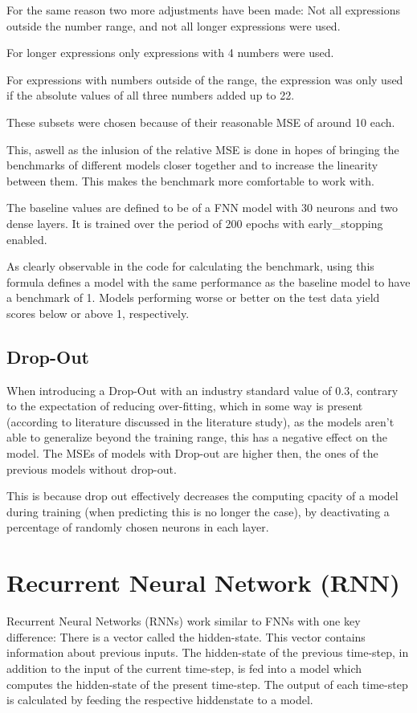 \documentclass{article}
\begin{document}
For the same reason two more adjustments have been made:
Not all expressions outside the number range, and not all longer expressions 
were used. 

For longer expressions only expressions with 4 numbers were used.

For expressions with numbers outside of the range, the expression was only 
used if the absolute values of all three numbers added up to 22.

These subsets were chosen because of their reasonable MSE of around 10 each.

This, aswell as the inlusion of the relative MSE is done in hopes of 
bringing the benchmarks of different models closer together and to increase 
the linearity between them. This makes the benchmark more comfortable to 
work with.

The baseline values are defined to be of a FNN model with 30 neurons and two 
dense layers. It is trained over the period of 200 epochs with 
early\_stopping enabled.

As clearly observable in the code for calculating the benchmark, using this 
formula defines a model with the same performance as the baseline model to 
have a benchmark of 1. Models performing worse or better on the test data 
yield scores below or above 1, respectively.


\subsection{Drop-Out}
When introducing a Drop-Out with an industry standard value of 0.3, contrary 
to the expectation of reducing over-fitting, which in some way is present 
(according to literature discussed in the literature study), as the models 
aren't able to generalize beyond the training range, this has a negative 
effect on the model. The MSEs of models with Drop-out are higher then, the 
ones of the previous models without drop-out. 

This is because drop out effectively decreases the computing cpacity of a 
model during training (when predicting this is no longer the case), by 
deactivating a percentage of randomly chosen neurons in each layer.

\section{Recurrent Neural Network (RNN)}
Recurrent Neural Networks (RNNs) work similar to FNNs with one key 
difference: There is a vector called the hidden-state. This vector contains 
information about previous inputs. The hidden-state of the previous 
time-step, in addition to the input of the current time-step, is fed into a 
model which computes the hidden-state of the present time-step. The output 
of each time-step is calculated by feeding the respective hiddenstate to a 
model.
\end{document}
